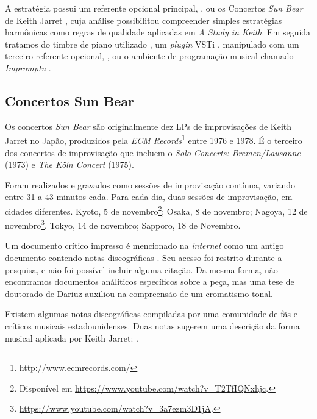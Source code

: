 A estratégia possui um referente opcional principal, , ou os Concertos \emph{Sun Bear}  de Keith Jarret , cuja análise possibilitou compreender simples estratégias harmônicas como regras de qualidade aplicadas em \emph{A Study in Keith}. Em seguida tratamos do timbre de piano utilizado , um \emph{plugin} VSTi , manipulado com um terceiro referente opcional, , ou o ambiente de programação musical chamado \emph{Impromptu} . 

\subsection{Concertos Sun Bear}\label{sec:sunbearanal}

Os concertos \emph{Sun Bear} são originalmente dez LPs  de improvisações de Keith Jarret no Japão, produzidos pela \emph{ECM Records}\footnote{http://www.ecmrecords.com/} entre 1976 e 1978. É o terceiro dos concertos de improvisação que incluem o \emph{Solo Concerts: Bremen/Lausanne} (1973) e \emph{The Köln Concert} (1975).

Foram realizados e gravados como sessões de improvisação contínua, variando entre 31 a 43 minutos cada. Para cada dia, duas sessões de improvisação, em cidades diferentes. Kyoto, 5 de novembro\footnote{Disponível em \url{https://www.youtube.com/watch?v=T2TfIQNxhjc}.}; Osaka, 8 de novembro; Nagoya, 12 de novembro\footnote{\url{https://www.youtube.com/watch?v=3a7ezm3D1jA}.}. Tokyo, 14 de novembro; Sapporo, 18 de Novembro.

Um documento crítico impresso é mencionado na \emph{internet} como um antigo documento contendo notas discográficas \cite{rollingstone1985}. Seu acesso foi restrito durante a pesquisa, e não foi possível incluir alguma citação. Da mesma forma, não encontramos documentos análiticos específicos sobre a peça, mas uma tese de doutorado de Dariuz  auxiliou na compreensão de um cromatismo tonal.

 Existem algumas notas discográficas compiladas por uma comunidade de fãs e críticos musicais estadounidenses. Duas notas sugerem uma descrição da forma musical aplicada por Keith Jarret: \cite[p.~129]{jarret_discography_2014}. 

